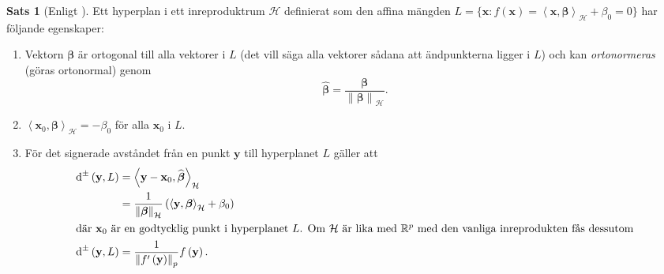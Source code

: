 \documentclass[a4paper, 12pt]{report}
\theoremstyle{definition}
\newtheorem{thm}{Sats}[section]
\theoremstyle{remark}
\newcommand{\bfbeta}{{\boldsymbol{\beta}}}
\newcommand{\bfx}{\mathbf{x}}
\newcommand{\llangle}{\left\langle}
\newcommand{\rrangle}{\right\rangle}
\newcommand{\sephyp}{\{ \mathbf{x} : f\left(\mathbf{x}\right)=\inner{\bfx}{\bfbeta}_\mathcal{H} + \beta_0=0\}}
\newcommand{\inner}[2]{\llangle #1, #2 \rrangle}
\newcommand{\hil}{\mathcal{H}}
\begin{document}
\begin{thm}[Enligt \cite{ESL}]\label{thm:hyperplan}
	Ett hyperplan i ett inreproduktrum $\hil$ definierat som den affina mängden $L=\sephyp$ har följande egenskaper:
	\begin{enumerate}
		\item Vektorn $\bfbeta$ är ortogonal till alla vektorer i $L$ (det vill säga alla vektorer sådana att ändpunkterna ligger i $L$) och kan \emph{ortonormeras} (göras ortonormal) genom
		\begin{equation*}
			\widehat{\bfbeta} = \frac{\bfbeta}{\left\|\bfbeta\right\|_\hil}.
		\end{equation*}
		\item $\inner{\bfx_0}{\bfbeta}_\hil = -\beta_0$ för alla $\mathbf{x}_0$ i $L$.
		\item
		För det signerade avståndet från en punkt $\mathbf{y}$ till hyperplanet $L$ gäller att
		\begin{align*}
			\operatorname{d}^\pm \left(\mathbf{y}, L\right) &=\inner{\mathbf{y}-\mathbf{x}_0}{\widehat{\bfbeta}}_\hil\\
			&=\frac{1}{\left\|\bfbeta\right\|_\hil}\left(\inner{\mathbf{y}}{\bfbeta}_\hil+\beta_0\right)\\
\intertext{där $\bfx_0$ är en godtycklig punkt i hyperplanet $L$. Om $\hil$ är lika med $\mathbb{R}^p$ med den vanliga inreprodukten fås dessutom}
			\operatorname{d}^\pm \left(\mathbf{y}, L\right)			&=\frac{1}{\left\|f^\prime\left(\mathbf{y}\right)\right\|_p}f\left(\mathbf{y}\right).
		\end{align*}
	\end{enumerate}
\end{thm}
\end{document}
